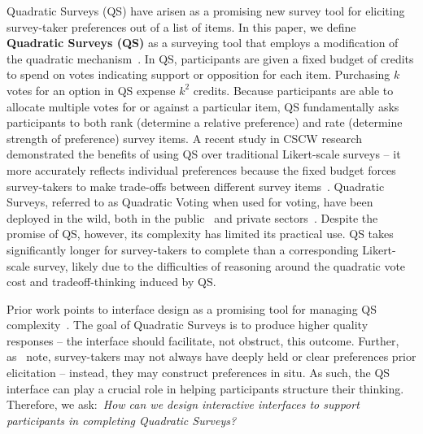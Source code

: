 Quadratic Surveys (QS) have arisen as a promising new survey tool for eliciting survey-taker preferences out of a list of items. In this paper, we define \textbf{Quadratic Surveys (QS)} as a surveying tool that employs a modification of the quadratic mechanism~\cite{grovesOptimalAllocationPublic1977}. In QS, participants are given a fixed budget of credits to spend on votes indicating support or opposition for each item. Purchasing $k$ votes for an option in QS expense $k^2$ credits. Because participants are able to allocate multiple votes for or against a particular item, QS fundamentally asks participants to both rank (determine a relative preference) and rate (determine strength of preference) survey items. A recent study in CSCW research demonstrated the benefits of using QS over traditional Likert-scale surveys -- it more accurately reflects individual preferences because the fixed budget forces survey-takers to make trade-offs between different survey items~\cite{chengCanShowWhat2021}. Quadratic Surveys, referred to as Quadratic Voting when used for voting, have been deployed in the wild, both in the public~\cite{rogersColoradoTriedNew2019, teamTaiwanDigitalMinister} and private sectors~\cite{Gov4gitDecentralizedPlatform2023}.  Despite the promise of QS, however, its complexity has limited its practical use. QS takes significantly longer for survey-takers to complete than a corresponding Likert-scale survey, likely due to the difficulties of reasoning around the quadratic vote cost and tradeoff-thinking induced by QS.



Prior work points to interface design as a promising tool for managing QS complexity~\cite{engstrom2020politics, weijtersEffectRatingScale2010, kierujVariationsResponseStyle2010, toepoelSmileysStarsHearts2019, farzandAestheticsEvaluatingResponse2024, xiaoTellMeYourself2020, pielotDidYouMisclick2024}. The goal of Quadratic Surveys is to produce higher quality responses --  the interface should facilitate, not obstruct, this outcome. Further, as~\textcite{lichtensteinConstructionPreference2006} note, survey-takers may not always have deeply held or clear preferences prior elicitation -- instead, they may construct preferences in situ. As such, the QS interface can play a crucial role in helping participants structure their thinking. Therefore, we ask:~\textit{How can we design interactive interfaces to support participants in completing Quadratic Surveys?}

